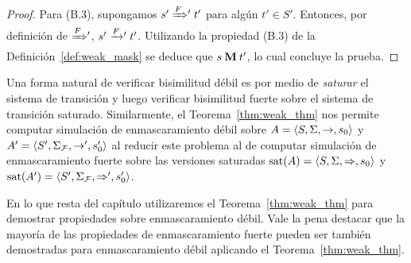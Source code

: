 \begin{proof}
Para (B.3), supongamos $s' \mathrel{{\xRightarrow[]{F}}{}'} t'$ para algún $t' \in S'$.  Entonces, por definición de ${\mathrel{{\xRightarrow[]{F}}{}'}}$, $s' \mathrel{{\xrightarrow[]{F}}{}'} t'$.  Utilizando la propiedad (B.3) de la Definición~\ref{def:weak_mask} se deduce que $s \mathbin{\mathbf{M}} t'$, lo cual concluye la prueba.
 \qedhere 
 \end{proof} 
 
Una forma natural de verificar bisimilitud débil es por medio de \emph{saturar}
el sistema de transición  \cite{FernandezM91,Milner89} y luego verificar bisimilitud fuerte sobre el sistema de transición saturado.
Similarmente, el Teorema~\ref{thm:weak_thm} nos permite computar simulación de enmascaramiento débil sobre $A =\langle S, \Sigma, \rightarrow, s_0 \rangle$ y $A' =\langle S', \Sigma_{\mathcal{F}}, \rightarrow', s'_0 \rangle$ al reducir este problema al de computar simulación de enmascaramiento fuerte sobre las versiones saturadas $\textrm{sat}(A) =\langle S, \Sigma, \Rightarrow, s_0 \rangle$ y $\textrm{sat}(A') =\langle S', \Sigma_{\mathcal{F}}, \Rightarrow', s'_0 \rangle$. 

En lo que resta del capítulo utilizaremos el Teorema~\ref{thm:weak_thm} para demostrar propiedades sobre enmascaramiento débil. Vale la pena destacar que la mayoría de las propiedades de enmascaramiento fuerte pueden ser también demostradas para enmascaramiento débil aplicando el Teorema~\ref{thm:weak_thm}.
	
